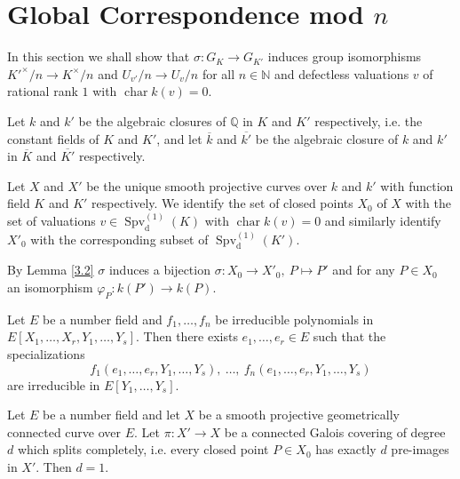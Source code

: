 \section{Global Correspondence mod \texorpdfstring{$n$}{n}}

In this section we shall show that $\sigma: G_K\to G_{K'}$ induces group isomorphisms $K'^\times/n\to K^\times/n$ and $U_{v'}/n\to U_v/n$ for all $n\in\mathbb{N}$ and defectless valuations $v$ of rational rank $1$ with $\operatorname{char}k(v) =0$.

Let $k$ and $k'$ be the algebraic closures of $\mathbb{Q}$ in $K$ and $K'$ respectively, i.e. the constant fields of $K$ and $K'$, and let $\overline{k}$ and $\overline{k'}$ be the algebraic closure of $k$ and $k'$ in $\overline{K}$ and $\overline{K'}$ respectively.

Let $X$ and $X'$ be the unique smooth projective curves over $k$ and $k'$ with function field $K$ and $K'$ respectively. We identify the set of closed points $X_0$ of $X$ with the set of valuations $v\in\operatorname{Spv}_\text{d}^{(1)}(K)$ with $\operatorname{char} k(v)=0$ and similarly identify $X'_0$ with the corresponding subset of $\operatorname{Spv}_\text{d}^{(1)}(K')$. 

By Lemma \ref{3.2} $\sigma$ induces a bijection $\sigma: X^{\phantom{'}}_0\to X'_0,\ P\mapsto P'$ and for any $P\in X_0$ an isomorphism $\varphi_P: k(P')\to k(P)$.

\begin{theorem}\label{hilberts-irreducibility-theorem}
Let $E$ be a number field and $f_1,\ldots, f_n$ be irreducible polynomials in $E[X_1,\ldots,X_r,Y_1,\ldots,Y_s]$. Then there exists $e_1,\ldots,e_r\in E$ such that the specializations
\[ f_1(e_1,\ldots,e_r,Y_1,\ldots,Y_s),\ \ldots,\ f_n(e_1,\ldots,e_r,Y_1,\ldots,Y_s) \]
are irreducible in $E[Y_1,\ldots,Y_s]$.
\end{theorem}

\begin{lemma}\label{4.1}
Let $E$ be a number field and let $X$ be a smooth projective geometrically connected curve over $E$. Let $\pi:X'\to X$ be a connected Galois covering of degree $d$ which splits completely, i.e. every closed point $P\in X_0$ has exactly $d$ pre-images in $X'$. Then $d=1$.
\end{lemma}

